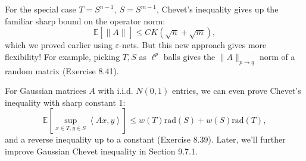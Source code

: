 \begin{remark}
\label{rmk:8.6.2}
For the special case $T = S^{n - 1}, \ S = S^{m - 1}$, Chevet's inequality gives up the familiar sharp bound 
on the operator norm:
\[ \mathbb{E}\left[ \lVert A \rVert_{} \right] \leq CK (\sqrt{n} + \sqrt{m}), \]
which we proved earlier using $\varepsilon$-nets. But this new approach gives more flexibility! For example, 
picking $T, S$ as $\ell^p$ balls gives the $\lVert A \rVert_{p \to q}$ norm of a random matrix (Exercise 8.41).
\end{remark}

\begin{remark}
\label{rmk:8.6.3}
For Gaussian matrices $A$ with i.i.d. $N(0, 1)$ entries, we can even prove Chevet's inequality with sharp 
constant 1: 
\[ \mathbb{E}\left[ \sup_{x \in T, y \in S} \left\langle Ax, y \right\rangle \right] \leq 
w(T) \mathrm{rad}(S) + w(S) \mathrm{rad}(T), \]
and a reverse inequality up to a constant (Exercise 8.39). Later, we'll further improve Gaussian Chevet 
inequality in Section 9.7.1.
\end{remark}

